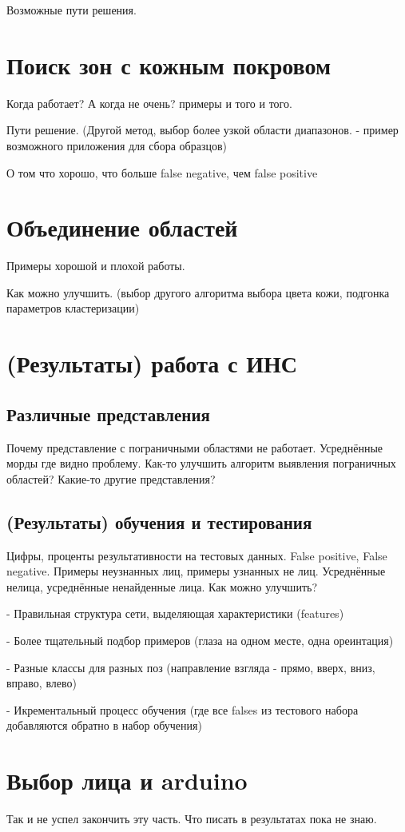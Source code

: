 \documentclass[12pt]{report}
\begin{document}
Возможные пути решения.
\section{Поиск зон с кожным покровом}
Когда работает? А когда не очень? примеры и того и того.

Пути решение. (Другой метод, выбор более узкой области диапазонов. - пример возможного приложения для сбора образцов)

О том что хорошо, что больше false negative, чем false positive
\section{Объединение областей}
Примеры хорошой и плохой работы.

Как можно улучшить. (выбор другого алгоритма выбора цвета кожи, подгонка параметров кластеризации)
\section{(Результаты) работа с ИНС}
\subsection{Различные представления}
Почему представление с пограничными областями не работает. Усреднённые морды где видно проблему. Как-то улучшить алгоритм выявления пограничных областей? Какие-то другие представления?
\subsection{(Результаты) обучения и тестирования}
Цифры, проценты результативности на тестовых данных. False positive, False negative. Примеры неузнанных лиц, примеры узнанных не лиц. Усреднённые нелица, усреднённые ненайденные лица.
Как можно улучшить?

- Правильная структура сети, выделяющая характеристики (features)

- Более тщательный подбор примеров (глаза на одном месте, одна ореинтация)

- Разные классы для разных поз (направление взгляда - прямо, вверх, вниз, вправо, влево)

- Икрементальный процесс обучения (где все falses из тестового набора добавляются обратно в набор обучения)
\section{Выбор лица и arduino}
Так и не успел закончить эту часть. Что писать в результатах пока не знаю.
\end{document}
